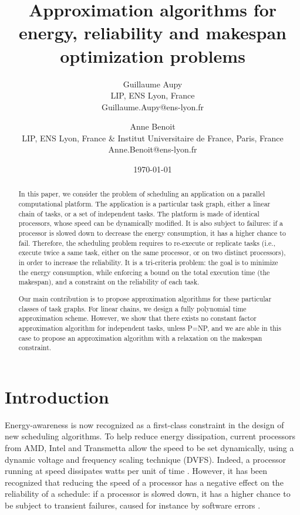 \documentclass[a4paper]{article}
\title{Approximation algorithms for energy, reliability and makespan
  optimization problems}
\author{Guillaume Aupy\\
   LIP, ENS Lyon, France\\
   Guillaume.Aupy@ens-lyon.fr \\
   \and
   Anne Benoit \\
   LIP, ENS Lyon, France \& Institut Universitaire de France, Paris, France \\
   Anne.Benoit@ens-lyon.fr \\
   }
\date{\today}
\theoremstyle{plain}
\theoremstyle{definition}
\theoremstyle{remark}
\begin{document}
\maketitle

\begin{abstract}
  In this paper, we consider the problem of scheduling an application
  on a parallel computational platform. The application is a
  particular task graph, either a linear chain of tasks, or a set of
  independent tasks. The platform is made of identical processors,
  whose speed can be dynamically modified. It is also subject to
  failures: if a processor is slowed down to decrease the energy
  consumption, it has a higher chance to fail. Therefore, the
  scheduling problem requires to re-execute or replicate tasks (i.e.,
  execute twice a same task, either on the same processor, or on two
  distinct processors), in order to increase the reliability. It is a
  tri-criteria problem: the goal is to minimize the energy
  consumption, while enforcing a bound on the total execution time
  (the makespan), and a constraint on the reliability of each task. 

  Our main contribution is to propose approximation algorithms for
  these particular classes of task graphs.  For linear chains, we
  design a fully polynomial time approximation scheme. However, we
  show that there exists no constant factor approximation algorithm
  for independent tasks, unless P=NP, and we are able in this case to
  propose an approximation algorithm with a relaxation on the makespan
  constraint.
\end{abstract}




\section{Introduction}
\label{sec.intro}

Energy-awareness is now recognized as a first-class constraint in the
design of new scheduling algorithms. To help reduce energy
dissipation, current processors from AMD, Intel and Transmetta allow
the speed to be set dynamically, using a dynamic voltage and frequency
scaling technique (DVFS). Indeed, a processor running at speed 
dissipates  watts per unit of time \cite{pow3IPDPS}.  However,
it has been recognized that reducing the speed of a processor has a
negative effect on the reliability of a schedule: if a processor is
slowed down, it has a higher chance to be subject to transient
failures, caused for instance by software errors 
\cite{Zhu04EEM,Degal05SEI}. 
\end{document}
